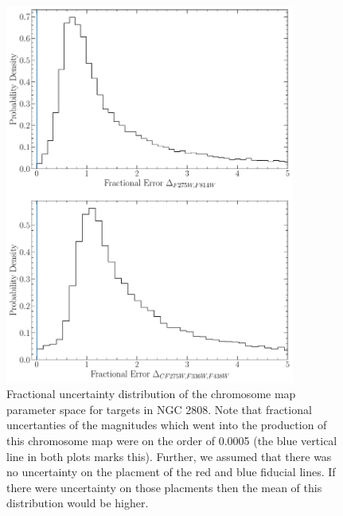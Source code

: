 \begin{figure}
  \centering
  \includegraphics[width=0.85\textwidth]{figures/ngc2808/ChromosomeMapFractionalErrorDist.pdf}
  \caption{Fractional uncertainty distribution of the chromosome map parameter space for targets in NGC 2808. Note
  that fractional uncertanties of the magnitudes which went into the production of this chromosome
  map were on the order of 0.0005 (the blue vertical line in both plots marks this). Further, we assumed that there was no uncertainty on the placment
  of the red and blue fiducial lines. If there were uncertainty on those placments then the mean of this 
  distribution would be higher.}
  \label{fig:chromMapUn}
\end{figure}


